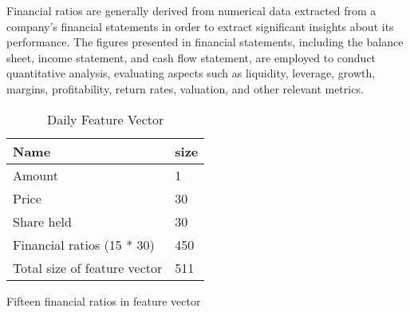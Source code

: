 {Financial ratios are generally derived from numerical data extracted from a company's financial statements in order to extract significant insights about its performance. The figures presented in financial statements, including the balance sheet, income statement, and cash flow statement, are employed to conduct quantitative analysis, evaluating aspects such as liquidity, leverage, growth, margins, profitability, return rates, valuation, and other relevant metrics.

 \begin{table}[htbp]
\caption{Daily Feature Vector}
\begin{center}
\begin{tabular}{|l|l|}
\hline
Name                         & size \\ \hline
Amount                       & 1    \\ \hline
Price                        & 30   \\ \hline
Share held                   & 30   \\ \hline
Financial ratios (15 * 30)     & 450  \\ \hline
Total size of feature vector & 511  \\ \hline
\end{tabular}
\label{tab:featurevectore}
\end{center}
\end{table}


\begin{table}[htbp]
\caption{Fifteen financial ratios in feature vector}
\begin{center}


\end{center}
\end{table}}
